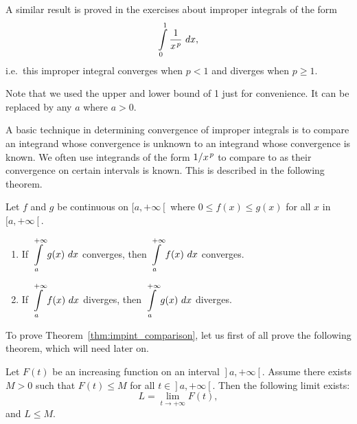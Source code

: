 A similar result is proved in the exercises about improper integrals of the form 
$$\displaystyle \int\limits_0^1\frac1{x\hskip1pt ^p}\ dx,$$
i.e.\ this improper integral  converges when $p<1$ and diverges when $p\geq 1.$


Note that we used the upper and lower bound of 1 just for convenience. It can be replaced by any $a$ where $a>0$. 

A basic technique in determining convergence of improper integrals is to compare an integrand whose convergence is unknown to an integrand whose convergence is known. We often use integrands of the form $1/x\hskip1pt ^p$ to compare to as their convergence on certain intervals is known. This is described in the following theorem.




\begin{theorem}\label{thm:impint_comparison}
Let $f$ and $g$ be continuous on $[a,+\infty\left[\right.$ where $0\leq f(x)\leq g(x)$ for all $x$ in $[a,+\infty\left[\right.$. 
	\begin{enumerate}
	\item		If $\ds \int\limits_a^{+\infty} g(x)\ dx$ converges, then $\displaystyle \displaystyle \int\limits_a^{+\infty} f(x)\ dx$ converges.
	\item		If $\ds \int\limits_a^{+\infty} f(x)\ dx$ diverges, then $\ds \int\limits_a^{+\infty} g(x)\ dx$ diverges.
	\end{enumerate}
	\end{theorem}
	
\ifanalysis

\pagebreak
To prove Theorem~\ref{thm:impint_comparison}, let us first of all prove the following theorem, which will need later on. 
\begin{theorem}\label{lemma1}
Let $F(t)$ be an increasing function on an interval $\left.\right]a,+\infty\left[\right.$. Assume there exists $M>0$ such that $F(t)\leq M$ for all $t\in \left.\right]a,+\infty\left[\right.$. Then the following limit exists:
$$L=\lim_{t\to+\infty}F(t),$$
and $L\leq M$. 
\end{theorem}

